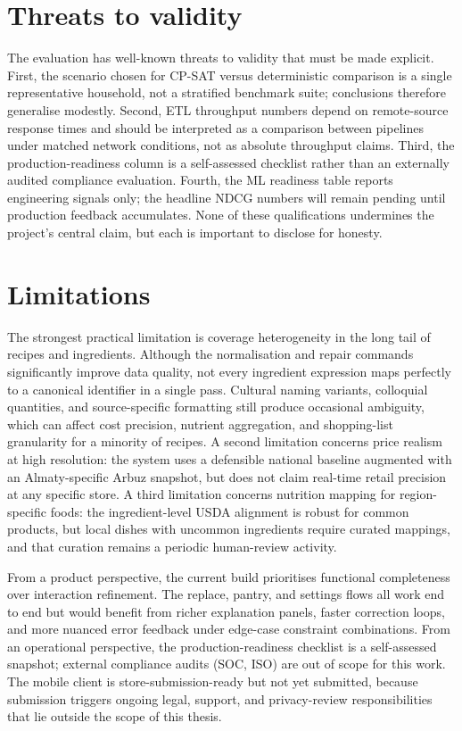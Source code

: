 \section{Threats to validity}

The evaluation has well-known threats to validity that must be made explicit. First, the scenario chosen for CP-SAT versus deterministic comparison is a single representative household, not a stratified benchmark suite; conclusions therefore generalise modestly. Second, ETL throughput numbers depend on remote-source response times and should be interpreted as a comparison between pipelines under matched network conditions, not as absolute throughput claims. Third, the production-readiness column is a self-assessed checklist rather than an externally audited compliance evaluation. Fourth, the ML readiness table reports engineering signals only; the headline NDCG numbers will remain pending until production feedback accumulates. None of these qualifications undermines the project's central claim, but each is important to disclose for honesty.

\section{Limitations}

The strongest practical limitation is coverage heterogeneity in the long tail of recipes and ingredients. Although the normalisation and repair commands significantly improve data quality, not every ingredient expression maps perfectly to a canonical identifier in a single pass. Cultural naming variants, colloquial quantities, and source-specific formatting still produce occasional ambiguity, which can affect cost precision, nutrient aggregation, and shopping-list granularity for a minority of recipes. A second limitation concerns price realism at high resolution: the system uses a defensible national baseline augmented with an Almaty-specific Arbuz snapshot, but does not claim real-time retail precision at any specific store. A third limitation concerns nutrition mapping for region-specific foods: the ingredient-level USDA alignment is robust for common products, but local dishes with uncommon ingredients require curated mappings, and that curation remains a periodic human-review activity.

From a product perspective, the current build prioritises functional completeness over interaction refinement. The replace, pantry, and settings flows all work end to end but would benefit from richer explanation panels, faster correction loops, and more nuanced error feedback under edge-case constraint combinations. From an operational perspective, the production-readiness checklist is a self-assessed snapshot; external compliance audits (SOC, ISO) are out of scope for this work. The mobile client is store-submission-ready but not yet submitted, because submission triggers ongoing legal, support, and privacy-review responsibilities that lie outside the scope of this thesis.

